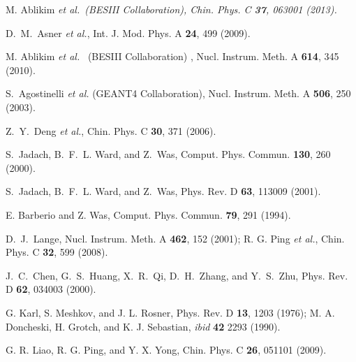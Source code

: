 \documentclass[aps,prd,twocolumn,showpacs,floatfix,byrevtex]{revtex4-1}
\newcommand{\etal}{\it et al.\rm}
\begin{document}
\begin{thebibliography}{99}


 M. Ablikim \etal ~(BESIII Collaboration), Chin. Phys. C {\bf 37}, 063001 (2013).

 D.~M.~Asner {\it et al.}, Int. J. Mod. Phys. A {\bf 24}, 499 (2009).

M. Ablikim {\it et al.} ~(BESIII Collaboration) , Nucl. Instrum. Meth. A {\bf 614}, 345 (2010).

S.~Agostinelli {\it et al.} (GEANT4 Collaboration), Nucl. Instrum. Meth. A {\bf 506}, 250 (2003).

 Z.~Y.~Deng {\it et al.}, Chin. Phys. C {\bf 30}, 371 (2006).

 S.~Jadach, B.~F.~L. Ward, and Z.~Was, Comput. Phys. Commun. {\bf 130}, 260 (2000).

S.~Jadach, B.~F.~L. Ward, and Z.~Was, Phys. Rev. D {\bf 63}, 113009 (2001).

 E. Barberio and Z. Was, Comput. Phys. Commun. {\bf
    79}, 291 (1994).

D.~J.~Lange, Nucl. Instrum. Meth. A {\bf 462}, 152 (2001); R. G. Ping {\it et al.}, Chin. Phys. C {\bf 32}, 599 (2008).

 J.~C.~Chen, G.~S.~Huang, X.~R.~Qi, D.~H.~Zhang, and Y.~S.~Zhu, Phys.
Rev. D {\bf 62}, 034003 (2000).

 G. Karl, S. Meshkov, and J. L. Rosner, Phys. Rev. D
  {\bf 13}, 1203 (1976); M. A. Doncheski, H. Grotch, and
  K. J. Sebastian, {\it ibid} {\bf 42} 2293 (1990).

 G. R. Liao, R. G. Ping, and Y. X. Yong, Chin. Phys. C {\bf 26}, 051101 (2009).
 
 


\end{thebibliography}
\end{document}
